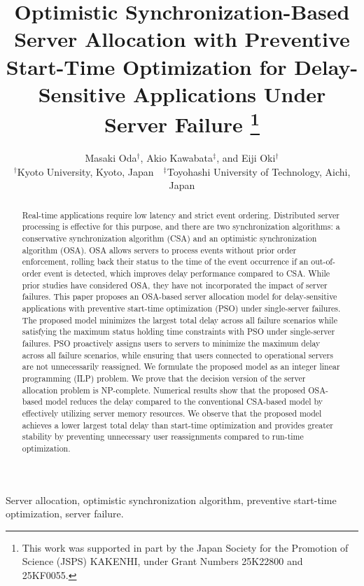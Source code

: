\documentclass[conference]{IEEEtran}
\begin{document}
\begin{CJK}{UTF8}{ipxm}

\title{\Large
Optimistic Synchronization-Based Server Allocation with Preventive Start-Time Optimization for Delay-Sensitive Applications Under Server Failure
\thanks{This work was supported in part by the Japan Society for the Promotion of Science (JSPS) KAKENHI, under Grant Numbers 25K22800 and 25KF0055.}
}
\author{Masaki Oda$^\dag$, Akio Kawabata$^\ddag$, and Eiji Oki$^\dag$\\
$^\dag$Kyoto University, Kyoto, Japan\ \ $^\ddag$Toyohashi University of Technology, Aichi, Japan} 
\maketitle
\thispagestyle{empty}

\begin{abstract}
Real-time applications require low latency and strict event ordering.  
Distributed server processing is effective for this purpose, and there are two synchronization algorithms: a conservative synchronization algorithm (CSA) and an optimistic synchronization algorithm (OSA).
OSA allows servers to process events without prior order enforcement, rolling back their status to the time of the event occurrence if an out-of-order event is detected, which improves delay performance compared to CSA.
While prior studies have considered OSA, they have not incorporated the impact of server failures. 
This paper proposes an OSA-based server allocation model for delay-sensitive applications with preventive start-time optimization (PSO) under single-server failures.
The proposed model minimizes the largest total delay across all failure scenarios while satisfying the maximum status holding time constraints with PSO under single-server failures.
PSO proactively assigns users to servers to minimize the maximum delay across all failure scenarios, while ensuring that users connected to operational servers are not unnecessarily reassigned.  
We formulate the proposed model as an integer linear programming (ILP) problem.  
We prove that the decision version of the server allocation problem is NP-complete. 
Numerical results show that the proposed OSA-based model reduces the delay compared to the conventional CSA-based model by effectively utilizing server memory resources.
We observe that the proposed model achieves a lower largest total delay than start-time optimization and provides greater stability by preventing unnecessary user reassignments compared to run-time optimization.
\end{abstract}
\begin{IEEEkeywords}
Server allocation, optimistic synchronization algorithm, preventive start-time optimization, server failure.
\end{IEEEkeywords}


\end{CJK}
\end{document}
